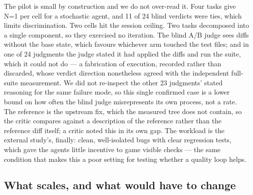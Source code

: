 \documentclass{sbc2019}%
\begin{document}
The pilot is small by construction and we do not over-read it. Four tasks give
N=1 per cell for a stochastic agent, and 11 of 24 blind verdicts were ties,
which limits discrimination. Two cells hit the session ceiling. Two tasks
decomposed into a single component, so they exercised no iteration. The blind
A/B judge sees diffs without the base state, which favours whichever arm
touched the test files; and in one of 24 judgments the judge stated it had
applied the diffs and run the suite, which it could not do --- a fabrication of
execution, recorded rather than discarded, whose verdict direction nonetheless
agreed with the independent full-suite measurement. We did not re-inspect the
other 23 judgments' stated reasoning for the same failure mode, so this
single confirmed case is a lower bound on how often the blind judge
misrepresents its own process, not a rate. The reference is the
upstream fix, which the measured tree does not contain, so the critic compares
against a description of the reference rather than the reference diff itself; a
critic noted this in its own gap. The workload is the external study's, finally:
clean, well-isolated bugs with clear regression tests, which gave the agents
little incentive to game visible checks --- the same condition that makes this
a poor setting for testing whether a quality loop helps.

\subsection{What scales, and what would have to change}
\end{document}
